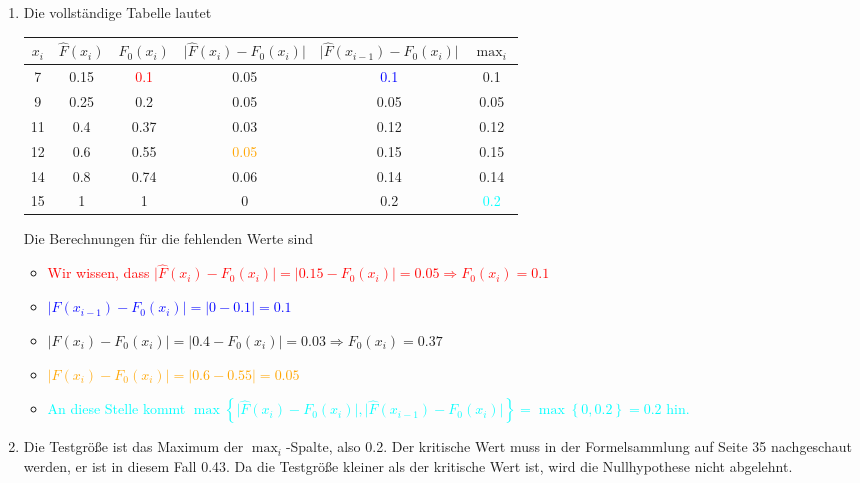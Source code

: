 \documentclass{article}
\begin{document}
	\begin{enumerate}[label=(\alph*)]
		\item Die vollständige Tabelle lautet
		\begin{center}
			\begin{tabular}{c|cccc|c}
				$x_i$ & $\hat{F}(x_i)$ & $F_0(x_i)$ & $\vert \hat{F}(x_i) - F_0(x_i)\vert$ & $\vert \hat{F}(x_{i-1}) - F_0(x_i)\vert$ & $\max_i$ \\
				\hline
				7 & 0.15 & \textcolor{red}{0.1} & 0.05 & \textcolor{blue}{0.1} & 0.1 \\
				9 & 0.25 & 0.2 & 0.05 & 0.05 & 0.05 \\
				11 & 0.4 & \textcolor{green!80!black}{0.37} & 0.03 & 0.12 & 0.12 \\
				12 & 0.6 & 0.55 & \textcolor{orange}{0.05} & 0.15 & 0.15 \\
				14 & 0.8 & 0.74 & 0.06 & 0.14 & 0.14 \\
				15 & 1 & 1 & 0 & 0.2 & \textcolor{cyan}{0.2}
			\end{tabular}
		\end{center}
		Die Berechnungen für die fehlenden Werte sind
		\begin{itemize}
			\item \textcolor{red}{Wir wissen, dass $\vert \hat{F}(x_i) - F_0(x_i)\vert = \vert 0.15 - F_0(x_i)\vert = 0.05 \Rightarrow F_0(x_i)=0.1$}
			\item \textcolor{blue}{$\vert \hat{F}(x_{i-1}) - F_0(x_i)\vert = \vert 0- 0.1\vert = 0.1$}
			\item \textcolor{green!80!black}{$\vert \hat{F}(x_i) - F_0(x_i)\vert = \vert 0.4 - F_0(x_i)\vert = 0.03 \Rightarrow F_0(x_i)=0.37$}
			\item \textcolor{orange}{$\vert \hat{F}(x_i) - F_0(x_i)\vert = \vert 0.6-0.55\vert = 0.05$}
			\item \textcolor{cyan}{An diese Stelle kommt $\max\left\lbrace \vert \hat{F}(x_i) - F_0(x_i)\vert,\vert \hat{F}(x_{i-1}) - F_0(x_i)\vert\right\rbrace = \max \left\lbrace 0,0.2\right\rbrace =0.2$ hin.}
		\end{itemize}
		\item Die Testgröße ist das Maximum der $\max_i$-Spalte, also 0.2. Der kritische Wert muss in der Formelsammlung auf Seite 35 nachgeschaut werden, er ist in diesem Fall 0.43. Da die Testgröße kleiner als der kritische Wert ist, wird die Nullhypothese nicht abgelehnt. 
	\end{enumerate}
	
\end{document}

